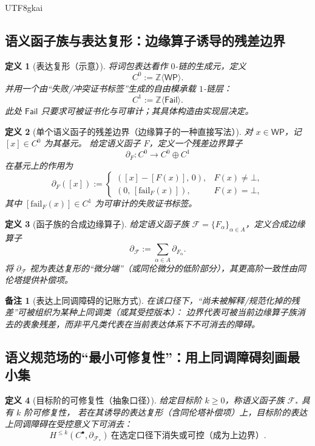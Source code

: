 \documentclass[12pt]{article}
\newtheorem{definition}{定义}[section]
\newtheorem{remark}{备注}[section]
\begin{document}
\begin{CJK*}{UTF8}{gkai}
\subsection{语义函子族与表达复形：边缘算子诱导的残差边界}
\label{subsec:tex20-ch2-expression-complex}

\begin{definition}[表达复形（示意）]
将词包表达看作 $0$-链的生成元，定义
\[
C^0:=\mathbb{Z}\langle \mathsf{WP}\rangle.
\]
并用一个由“失败/冲突证书标签”生成的自由模承载 $1$-链层：
\[
C^1:=\mathbb{Z}\langle \mathsf{Fail}\rangle.
\]
此处 $\mathsf{Fail}$ 只要求可被证书化与可审计；其具体构造由实现层决定。
\end{definition}

\begin{definition}[单个语义函子的残差边界（边缘算子的一种直接写法）]
对 $x\in\mathsf{WP}$，记 $[x]\in C^0$ 为其基元。
给定语义函子 $F$，定义一个残差边界算子
\[
\partial_F:C^0\to C^0\oplus C^1
\]
在基元上的作用为
\[
\partial_F([x]):=
\begin{cases}
([x]-[F(x)],\,0), & F(x)\neq \bot,\\
(0,\,[\mathrm{fail}_F(x)]), & F(x)=\bot,
\end{cases}
\]
其中 $[\mathrm{fail}_F(x)]\in C^1$ 为可审计的失败证书标签。
\end{definition}

\begin{definition}[函子族的合成边缘算子]
给定语义函子族 $\mathcal{F}=\{F_\alpha\}_{\alpha\in A}$，定义合成边缘算子
\[
\partial_{\mathcal{F}}:=\sum_{\alpha\in A}\partial_{F_\alpha}.
\]
将 $\partial_{\mathcal{F}}$ 视为表达复形的“微分端”（或同伦微分的低阶部分），其更高阶一致性由同伦塔提供补偿项。
\end{definition}

\begin{remark}[表达上同调障碍的记账方式]
在该口径下，“尚未被解释/规范化掉的残差”可被组织为某种上同调类（或其受控版本）：
边界代表可被当前边缘算子族消去的表象残差，而非平凡类代表在当前表达体系下不可消去的障碍。
\end{remark}

\subsection{语义规范场的“最小可修复性”：用上同调障碍刻画最小集}
\label{subsec:tex20-ch2-minimal-repairable-field}

\begin{definition}[目标阶的可修复性（抽象口径）]
给定目标阶 $k\ge 0$，称语义函子族 $\mathcal{F}_\ast$ 具有 $k$ 阶可修复性，
若在其诱导的表达复形（含同伦塔补偿项）上，目标阶的表达上同调障碍在受控意义下可消去：
\[
H^{\le k}(C^\bullet,\partial_{\mathcal{F}_\ast})\ \text{在选定口径下消失或可控（成为上边界）}.
\]
\end{definition}


\end{CJK*}
\end{document}
